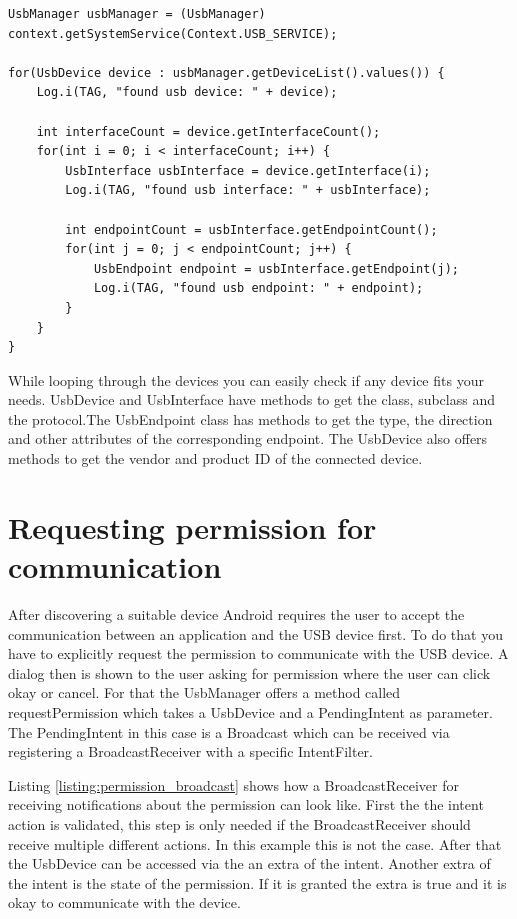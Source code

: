 \begin{lstlisting}[caption=Accessing UsbInterface and UsbEndpoint, label=listing:interface_endpoint]
UsbManager usbManager = (UsbManager) context.getSystemService(Context.USB_SERVICE);
		
for(UsbDevice device : usbManager.getDeviceList().values()) {
	Log.i(TAG, "found usb device: " + device);
	
	int interfaceCount = device.getInterfaceCount();
	for(int i = 0; i < interfaceCount; i++) {
		UsbInterface usbInterface = device.getInterface(i);
		Log.i(TAG, "found usb interface: " + usbInterface);
		
		int endpointCount = usbInterface.getEndpointCount();
		for(int j = 0; j < endpointCount; j++) {
			UsbEndpoint endpoint = usbInterface.getEndpoint(j);
			Log.i(TAG, "found usb endpoint: " + endpoint);
		}
	}
}
\end{lstlisting}

While looping through the devices you can easily check if any device fits your needs. UsbDevice and UsbInterface have methods to get the class, subclass and the protocol.The UsbEndpoint class has methods to get the type, the direction and other attributes of the corresponding endpoint. The UsbDevice also offers methods to get the vendor and product ID of the connected device.

\section{Requesting permission for communication}
\label{section:request_permission}

After discovering a suitable device Android requires the user to accept the communication between an application and the USB device first. To do that you have to explicitly request the permission to communicate with the USB device. A dialog then is shown to the user asking for permission where the user can click okay or cancel. For that the UsbManager offers a method called requestPermission which takes a UsbDevice and a PendingIntent as parameter. The PendingIntent in this case is a Broadcast which can be received via registering a BroadcastReceiver with a specific IntentFilter.

Listing \ref{listing:permission_broadcast} shows how a BroadcastReceiver for receiving notifications about the permission can look like. First the the intent action is validated, this step is only needed if the BroadcastReceiver should receive multiple different actions. In this example this is not the case. After that the UsbDevice can be accessed via the an extra of the intent. Another extra of the intent is the state of the permission. If it is granted the extra is true and it is okay to communicate with the device.

